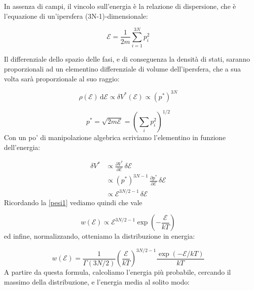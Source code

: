 \documentclass[a4paper]{report}
\begin{document}
In assenza di campi, il vincolo sull'energia è la relazione di dispersione, che è l'equazione di un'ipersfera (3N-1)-dimensionale:

\begin{equation}
    \mathcal{E} = \frac{1}{2m}\sum_{i=1}^{3N} p_i^2
    \label{ipersfera}
\end{equation}

Il differenziale dello spazio delle fasi, e di conseguenza la densità di stati, saranno proporzionali ad un elementino differenziale di volume dell'ipersfera, che a sua volta sarà proporzionale al suo raggio:

\begin{equation}
    \rho(\mathcal{E})\,\mathrm{d}\mathcal{E} \propto \delta V^{*}(\mathcal{E}) \propto (p^{*})^{3N}
\end{equation}

\begin{equation}
    p^{*} = \sqrt{2m\mathcal{E}} = \left(\sum_i p_i^2\right)^{1/2}
\end{equation}
Con un po' di manipolazione algebrica scriviamo l'elementino in funzione dell'energia:

\begin{equation}
    \begin{split}
        \delta V^{*} & \propto \frac{\partial V^{*}}{\partial \mathcal{E}} \,\delta \mathcal{E}\\
        & \propto (p^{*})^{3N-1}\,\frac{\partial p^{*}}{\partial \mathcal{E}} \,\delta \mathcal{E}\\
        & \propto \mathcal{E}^{3N/2-1}\,\delta\mathcal{E}
    \end{split}
\end{equation}
Ricordando la \eqref{pesi1} vediamo quindi che vale

\begin{equation}
    w(\mathcal{E}) \propto \mathcal{E}^{3N/2-1}\exp\left(-\frac{\mathcal{E}}{k T}\right)
\end{equation}
ed infine, normalizzando, otteniamo la distribuzione in energia:

\begin{equation}
    w(\mathcal{E}) = \frac{1}{\Gamma(3N/2)} \left(\frac{\mathcal{E}}{k T}\right)^{3N/2-1} \frac{\exp\left(-\mathcal{E}/k T\right)}{k T}
\end{equation}
A partire da questa formula, calcoliamo l'energia più probabile, cercando il massimo della distribuzione, e l'energia media al solito modo:
\end{document}
